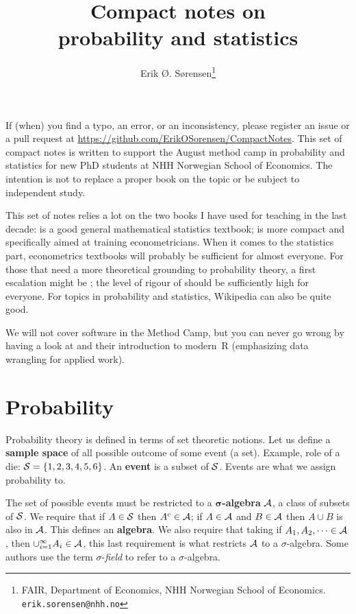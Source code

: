 \documentclass[10pt]{article}
\title{Compact notes on \\ probability and statistics}
\author{Erik Ø. Sørensen\thanks{FAIR, Department of Economics, NHH Norwegian
School of Economics. \texttt{erik.sorensen@nhh.no}}}
\begin{document}
\maketitle
\sloppy
\frenchspacing



\tableofcontents

\bigskip\bigskip

\noindent If (when) you find a typo, an error, or an inconsistency,
please register an issue or a pull request at \url{https://github.com/ErikOSorensen/CompactNotes}.
\thispagestyle{empty}
\newpage
\noindent This set of compact notes is written to support the August method camp
in probability and statistics for new PhD students at NHH Norwegian School of
Economics. The intention is not to replace a proper book on the topic or
be subject to independent study. 

This set of notes relies a lot on the two books I have used for teaching in the
last decade: \citet{Hogg2013} is a good  general mathematical statistics
textbook; \citet{Linton2017} is more compact and specifically aimed at training
econometricians. When it comes to the statistics part, econometrics textbooks
will probably be sufficient for almost everyone. For those that need a more
theoretical grounding to probability theory, a first escalation might be
\citet{Rosenthal2006}; the level of rigour of \citet{Billingsley1995} should be
sufficiently high for everyone. For topics in probability and statistics,
Wikipedia can also be quite good.

We will not cover software in the Method Camp, but you can never go wrong by
having a look at \citet{Wickham2017} and their introduction to modern~R (emphasizing
data wrangling for applied work).


\section{Probability}
Probability theory is defined in terms of set theoretic
notions. 
Let us define a \textbf{sample space} of all possible outcome of some
event (a set). Example, role of a die: $\mathcal{S} =\{1,2,3,4,5,6\}$. 
An \textbf{event} is a subset of $\mathcal{S}$. Events are what we assign probability
to.

The set of possible events must be restricted to a
$\mathbf{\sigma}$\textbf{-algebra} $\mathcal{A}$, a class of subsets of $\mathcal{S}$. We
require that if $A\in\mathcal{S}$ then $A^c\in\mathcal{A}$; if $A\in\mathcal{A}$ and $B\in\mathcal{A}$
then $A\cup B$ is also in $\mathcal{A}$. This defines an \textbf{algebra}. We also
require that taking  if $A_1,A_2,\dots\in \mathcal{A}$, then $\cup_{i=1}^\infty A_i
\in \mathcal{A}$, this last requirement is what restricts $\mathcal{A}$ to a
$\sigma$-algebra. Some authors use the term $\sigma$-\emph{field} to refer to a $\sigma$-algebra.
\end{document}
